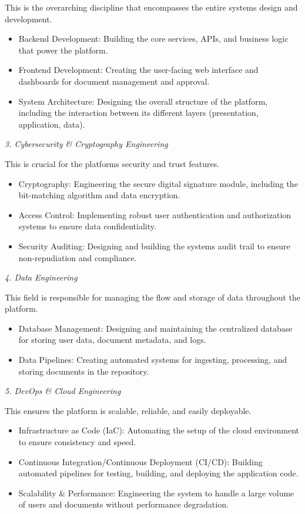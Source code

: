 \documentclass[12pt,oneside,openright,a4paper]{cpe-english-project}
\begin{document}
This is the overarching discipline that encompasses the entire
system\textquotesingle s design and development.

\begin{itemize}
\item
  Backend Development: Building the core services, APIs, and business
  logic that power the platform.
\item
  Frontend Development: Creating the user-facing web interface and
  dashboards for document management and approval.
\item
  System Architecture: Designing the overall structure of the platform,
  including the interaction between its different layers (presentation,
  application, data).
\end{itemize}

\emph{3. Cybersecurity \& Cryptography Engineering}

This is crucial for the platform\textquotesingle s security and trust
features.

\begin{itemize}
\item
  Cryptography: Engineering the secure digital signature module,
  including the bit-matching algorithm and data encryption.
\item
  Access Control: Implementing robust user authentication and
  authorization systems to ensure data confidentiality.
\item
  Security Auditing: Designing and building the system\textquotesingle s
  audit trail to ensure non-repudiation and compliance.
\end{itemize}

\emph{4. Data Engineering}

This field is responsible for managing the flow and storage of data
throughout the platform.

\begin{itemize}
\item
  Database Management: Designing and maintaining the centralized
  database for storing user data, document metadata, and logs.
\item
  Data Pipelines: Creating automated systems for ingesting, processing,
  and storing documents in the repository.
\end{itemize}

\emph{5. DevOps \& Cloud Engineering}

This ensures the platform is scalable, reliable, and easily deployable.

\begin{itemize}
\item
  Infrastructure as Code (IaC): Automating the setup of the cloud
  environment to ensure consistency and speed.
\item
  Continuous Integration/Continuous Deployment (CI/CD): Building
  automated pipelines for testing, building, and deploying the
  application code.
\item
  Scalability \& Performance: Engineering the system to handle a large
  volume of users and documents without performance degradation.
\end{itemize}
\end{document}
